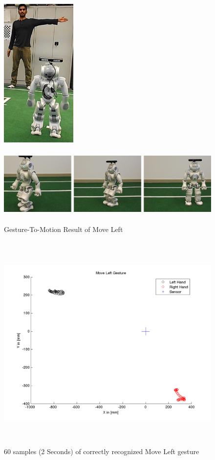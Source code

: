\begin{figure}
	[h] 
	\begin{minipage}
		{1 
		\textwidth} \centering 
		\includegraphics[height=75mm]{figures/result/usr-move-left.jpg} \caption*{} 
	\end{minipage}
	\begin{minipage}
		{1 
		\textwidth} 
		\includegraphics[height=42mm]{figures/result/nao-gm-move-left.jpg} 
	\end{minipage}
	\caption{Gesture-To-Motion Result of Move Left} \label{res:gm:move:left} 
\end{figure}
\begin{figure}
	[h] \centering 
	\includegraphics[height=110mm]{figures/result/test-move-left.jpg} \caption{60 samples (2 Seconds) of correctly recognized Move Left gesture}
	\label{res:pl:move:left}	 
\end{figure}
